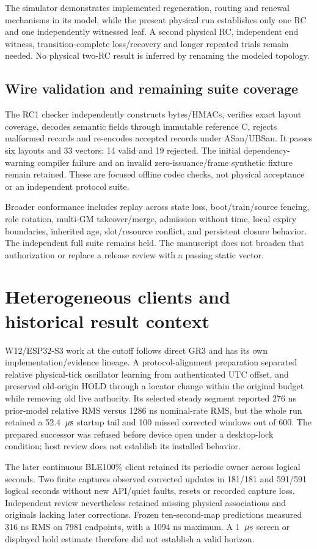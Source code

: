 \documentclass[11pt,letterpaper]{article}
\begin{document}
The simulator demonstrates implemented regeneration, routing and renewal mechanisms in its model, while the present physical run establishes only one RC and one independently witnessed leaf. A second physical RC, independent end witness, transition-complete loss/recovery and longer repeated trials remain needed. No physical two-RC result is inferred by renaming the modeled topology.

\subsection{Wire validation and remaining suite coverage}
The RC1 checker independently constructs bytes/HMACs, verifies exact layout coverage, decodes semantic fields through immutable reference C, rejects malformed records and re-encodes accepted records under ASan/UBSan. It passes six layouts and 33 vectors: 14 valid and 19 rejected. The initial dependency-warning compiler failure and an invalid zero-issuance/frame synthetic fixture remain retained. These are focused offline codec checks, not physical acceptance or an independent protocol suite.

Broader conformance includes replay across state loss, boot/train/source fencing, role rotation, multi-GM takeover/merge, admission without time, local expiry boundaries, inherited age, slot/resource conflict, and persistent closure behavior. The independent full suite remains held. The manuscript does not broaden that authorization or replace a release review with a passing static vector.

\section{Heterogeneous clients and historical result context}\label{sec:w12}
W12/ESP32-S3 work at the cutoff follows direct GR3 and has its own implementation/evidence lineage. A protocol-alignment preparation separated relative physical-tick oscillator learning from authenticated UTC offset, and preserved old-origin HOLD through a locator change within the original budget while removing old live authority. Its selected steady segment reported 276 ns prior-model relative RMS versus 1286 ns nominal-rate RMS, but the whole run retained a 52.4 $\,\mu\mathrm{s}$ startup tail and 100 missed corrected windows out of 600. The prepared successor was refused before device open under a desktop-lock condition; host review does not establish its installed behavior.

The later continuous BLE100\% client retained its periodic owner across logical seconds. Two finite captures observed corrected updates in 181/181 and 591/591 logical seconds without new API/quiet faults, resets or recorded capture loss. Independent review nevertheless retained missing physical associations and originals lacking later corrections. Frozen ten-second-map predictions measured 316 ns RMS on 7981 endpoints, with a 1094 ns maximum. A 1 $\,\mu\mathrm{s}$ screen or displayed hold estimate therefore did not establish a valid horizon.
\end{document}
